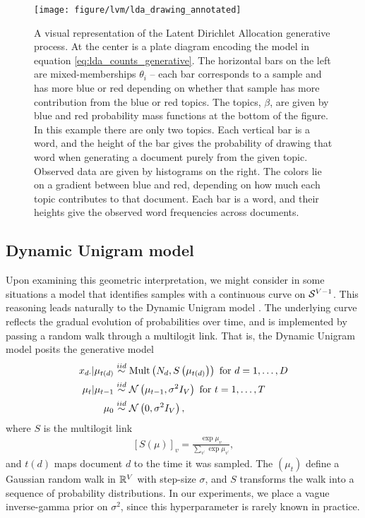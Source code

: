 \begin{figure}
  \centering
  \texttt{[image: figure/lvm/lda\_drawing\_annotated]}
  \caption{A visual representation of the Latent Dirichlet Allocation generative
    process. At the center is a plate diagram encoding the model in equation
    \ref{eq:lda_counts_generative}. The horizontal bars on the left are
    mixed-memberships $\theta_{i}$ -- each bar corresponds to a sample and has
    more blue or red depending on whether that sample has more contribution from
    the blue or red topics. The topics, $\beta$, are given by blue and red
    probability mass functions at the bottom of the figure. In this example
    there are only two topics. Each vertical bar is a word, and the height of
    the bar gives the probability of drawing that word when generating a
    document purely from the given topic. Observed data are given by histograms
    on the right. The colors lie on a gradient between blue and red, depending
    on how much each topic contributes to that document. Each bar is a word, and
    their heights give the observed word frequencies across documents.
    \label{fig:lda_drawing_annotated} }
\end{figure}

\subsection{Dynamic Unigram model}

Upon examining this geometric interpretation, we might consider in some
situations a model that identifies samples with a continuous curve on
$\mathcal{S}^{V - 1}$. This reasoning leads naturally to the Dynamic Unigram model
\citep{blei2006dynamic}. The underlying curve reflects the gradual evolution of
probabilities over time, and is implemented by passing a random walk through a
multilogit link. That is, the Dynamic Unigram model posits the generative model
\begin{align}
x_{d\cdot} \vert \mu_{t\left(d\right)}  &\overset{iid}{\sim} \textnormal{Mult}\left(N_{d}, S\left(\mu_{t\left(d\right)}\right)\right) \text{ for } d = 1, \dots, D \label{eq:unigram_generative} \\
\mu_{t} \vert \mu_{t - 1} &\overset{iid}{\sim} \mathcal{N}\left(\mu_{t - 1}, \sigma^{2}I_{V}\right) \text{ for } t = 1, \dots, T \nonumber \\
\mu_{0} &\overset{iid}{\sim} \mathcal{N}\left(0, \sigma^{2}I_{V}\right), \nonumber
\end{align}
where $S$ is the multilogit link
\begin{align*}
\left[S\left(\mu\right)\right]_{v} = \frac{\exp{\mu_{v}}}{\sum_{v^{\prime}} \exp{\mu_{v^{\prime}}}},
\end{align*}
and $t\left(d\right)$ maps document $d$ to the time it was sampled. The
$\left(\mu_{t}\right)$ define a Gaussian random walk in
$\mathbb{R}^{V}$ with step-size $\sigma$, and $S$ transforms the walk into a
sequence of probability distributions. In our experiments, we place a vague
inverse-gamma prior on $\sigma^{2}$, since this hyperparameter is rarely known
in practice.

